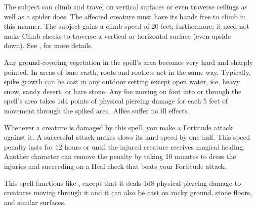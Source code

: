 \spelldur{\durmed}
\begin{spelleffect}
    The subject can climb and travel on vertical surfaces or even traverse ceilings as well as a spider does. The affected creature must have its hands free to climb in this manner. The subject gains a climb speed of 20 feet; furthermore, it need not make Climb checks to traverse a vertical or horizontal surface (even upside down). See , for more details.
\end{spelleffect}

\spellrng{\rngmed}
\begin{spelleffect}
  Any ground-covering vegetation in the spell's area becomes very hard and sharply pointed. In areas of bare earth, roots and rootlets act in the same way. Typically, spike growth can be cast in any outdoor setting except open water, ice, heavy snow, sandy desert, or bare stone. Any foe moving on foot into or through the spell's area takes 1d4 points of physical piercing damage for each 5 feet of movement through the spiked area. Allies suffer no ill effects.

  Whenever a creature is damaged by this spell, you make a Fortitude attack against it. A successful attack makes slows its land speed by one-half. This speed penalty lasts for 12 hours or until the injured creature receives magical healing. Another character can remove the penalty by taking 10 minutes to dress the injuries and succeeding on a Heal check that beats your Fortitude attack.
\end{spelleffect}

\begin{spelleffect}
  This spell functions like , except that it deals 1d8 physical piercing damage to creatures moving through it and it can also be cast on rocky ground, stone floors, and similar surfaces.
\end{spelleffect}

